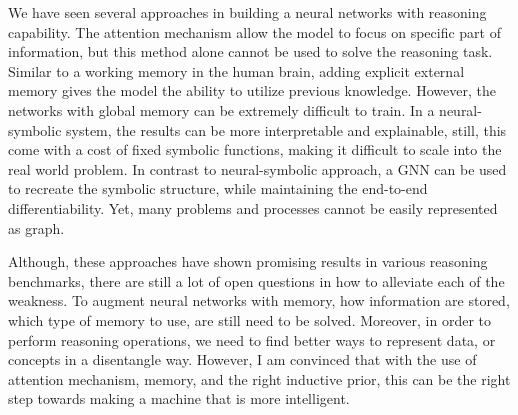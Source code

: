 \documentclass[journal]{IEEEtran}
\begin{document}
We have seen several approaches in building a neural networks with reasoning capability.
The attention mechanism allow the model to focus on specific part of information, 
but this method alone cannot be used to solve the reasoning task.
Similar to a working memory in the human brain, 
adding explicit external memory gives the model the ability to utilize previous knowledge.
However, the networks with global memory can be extremely difficult to train. 
In a neural-symbolic system, the results can be more interpretable and explainable,
still, this come with a cost of fixed symbolic functions, making it difficult to scale into the real world problem.
In contrast to neural-symbolic approach, a GNN can be used to recreate the symbolic structure, 
while maintaining the end-to-end differentiability. Yet, many problems and processes cannot be easily represented as graph.

Although, these approaches have shown promising results in various reasoning benchmarks, 
there are still a lot of open questions in how to alleviate each of the weakness. 
To augment neural networks with memory, how information are stored, which type of memory to use, are still need to be solved. 
Moreover, in order to perform reasoning operations, we need to find better ways to represent data, or concepts in a disentangle way.
However, I am convinced that with the use of attention mechanism, memory, and the right inductive prior, 
this can be the right step towards making a machine that is more intelligent.



\end{document}
